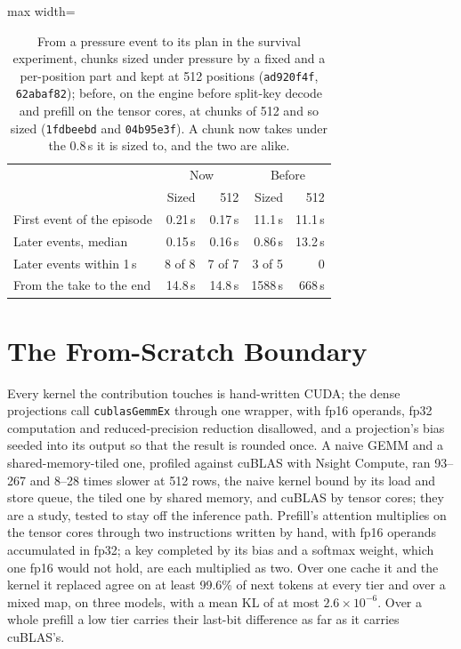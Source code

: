 \documentclass{article}
\begin{document}
\begin{table}[!ht]
\caption{From a pressure event to its plan in the survival experiment, chunks
sized under pressure by a fixed and a per-position part and kept at 512
positions (\texttt{ad920f4f}, \texttt{62abaf82}); before, on the engine before
split-key decode and prefill on the tensor cores, at chunks of 512 and so sized
(\texttt{1fdbeebd} and \texttt{04b95e3f}). A chunk now takes under the 0.8\,s it is
sized to, and the two are alike.}
\label{tab:prefill}
\centering
\small
\begin{adjustbox}{max width=\columnwidth}
\begin{tabular}{lrrrr}
\toprule
& \multicolumn{2}{c}{Now} & \multicolumn{2}{c}{Before} \\
& Sized & 512 & Sized & 512 \\
\midrule
First event of the episode & 0.21\,s & 0.17\,s & 11.1\,s & 11.1\,s \\
Later events, median & 0.15\,s & 0.16\,s & 0.86\,s & 13.2\,s \\
Later events within 1\,s & 8 of 8 & 7 of 7 & 3 of 5 & 0 \\
From the take to the end & 14.8\,s & 14.8\,s & 1588\,s & 668\,s \\
\bottomrule
\end{tabular}
\end{adjustbox}
\end{table}

\section{The From-Scratch Boundary}
\label{app:boundary}

Every kernel the contribution touches is hand-written CUDA; the dense
projections call \texttt{cublasGemmEx} through one wrapper, with fp16 operands,
fp32 computation and reduced-precision reduction disallowed, and a projection's
bias seeded into its output so that the result is rounded once. A naive GEMM
and a shared-memory-tiled one, profiled against cuBLAS with Nsight Compute,
ran 93--267 and 8--28 times slower at 512 rows, the naive kernel bound by its
load and store queue, the tiled one by shared memory, and cuBLAS by tensor
cores; they are a study, tested to stay off the inference path. Prefill's
attention multiplies on the tensor cores through two instructions written by
hand, with fp16 operands accumulated in fp32; a key completed by its bias and a
softmax weight, which one fp16 would not hold, are each multiplied as two. Over
one cache it and the kernel it replaced agree on at least 99.6\% of next tokens
at every tier and over a mixed map, on three models, with a mean KL of at most
$2.6 \times 10^{-6}$. Over a whole prefill a low tier carries their last-bit
difference as far as it carries cuBLAS's.
\end{document}
